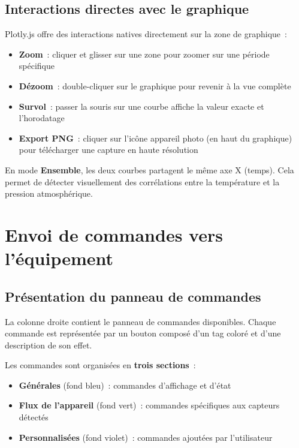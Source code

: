 \documentclass[a4paper,12pt]{article}
\newcommand{\tipbox}[2]{%
  \begin{tcolorbox}[mybox,
    colback=LightPurple, colframe=TipPurple,
    colbacktitle=TipPurple, coltitle=white,
    title={$\star$\enspace #1}]#2\end{tcolorbox}}
\begin{document}
\subsection{Interactions directes avec le graphique}

Plotly.js offre des interactions natives directement sur la zone de graphique~:

\begin{itemize}[noitemsep]
  \item \textbf{Zoom}~: cliquer et glisser sur une zone pour zoomer sur une p\'eriode sp\'ecifique
  \item \textbf{D\'ezoom}~: double-cliquer sur le graphique pour revenir \`a la vue compl\`ete
  \item \textbf{Survol}~: passer la souris sur une courbe affiche la valeur exacte et l'horodatage
  \item \textbf{Export PNG}~: cliquer sur l'ic\^one appareil photo (en haut du graphique) pour
        t\'el\'echarger une capture en haute r\'esolution
\end{itemize}

\tipbox{Astuce : comparer les deux flux}{
En mode \textbf{Ensemble}, les deux courbes partagent le m\^eme axe X (temps). Cela permet
de d\'etecter visuellement des corr\'elations entre la temp\'erature et la pression atmosph\'erique.
}

\section{Envoi de commandes vers l'\'equipement}

\subsection{Pr\'esentation du panneau de commandes}

La colonne droite contient le panneau de commandes disponibles. Chaque commande est
repr\'esent\'ee par un bouton compos\'e d'un tag color\'e et d'une description de son effet.

Les commandes sont organis\'ees en \textbf{trois sections}~:

\begin{itemize}[noitemsep]
  \item \textbf{G\'en\'erales} (fond bleu)~: commandes d'affichage et d'\'etat
  \item \textbf{Flux de l'appareil} (fond vert)~: commandes sp\'ecifiques aux capteurs d\'etect\'es
  \item \textbf{Personnalis\'ees} (fond violet)~: commandes ajout\'ees par l'utilisateur
\end{itemize}
\end{document}
